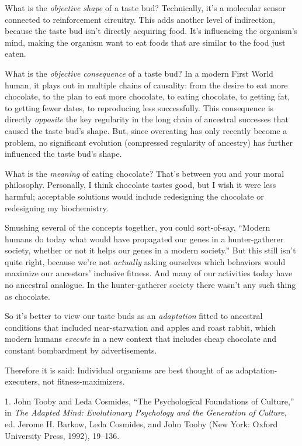 {
 What is the \textit{objective shape} of a taste bud? Technically,
it's a molecular sensor connected to reinforcement
circuitry. This adds another level of indirection, because the taste
bud isn't directly acquiring food. It's
influencing the organism's mind, making the organism
want to eat foods that are similar to the food just eaten.}

{
 What is the \textit{objective consequence} of a taste bud? In a
modern First World human, it plays out in multiple chains of causality:
from the desire to eat more chocolate, to the plan to eat more
chocolate, to eating chocolate, to getting fat, to getting fewer dates,
to reproducing less successfully. This consequence is directly
\textit{opposite} the key regularity in the long chain of ancestral
successes that caused the taste bud's shape. But, since
overeating has only recently become a problem, no significant evolution
(compressed regularity of ancestry) has further influenced the taste
bud's shape.}

{
 What is the \textit{meaning} of eating chocolate?
That's between you and your moral philosophy.
Personally, I think chocolate tastes good, but I wish it were less
harmful; acceptable solutions would include redesigning the chocolate
or redesigning my biochemistry.}

{
 Smushing several of the concepts together, you could sort-of-say,
``Modern humans do today what would have propagated
our genes in a hunter-gatherer society, whether or not it helps our
genes in a modern society.'' But this still
isn't quite right, because we're not
\textit{actually} asking ourselves which behaviors would maximize our
ancestors' inclusive fitness. And many of our
activities today have no ancestral analogue. In the hunter-gatherer
society there wasn't any such thing as chocolate.}

{
 So it's better to view our taste buds as an
\textit{adaptation} fitted to ancestral conditions that included
near-starvation and apples and roast rabbit, which modern humans
\textit{execute} in a new context that includes cheap chocolate and
constant bombardment by advertisements.}

{
 Therefore it is said: Individual organisms are best thought of as
adaptation-executers, not fitness-maximizers.}

\myendsectiontext


\bigskip

{
 1. John Tooby and Leda Cosmides, ``The
Psychological Foundations of Culture,'' in
\textit{The Adapted Mind: Evolutionary Psychology and the Generation of
Culture}, ed. Jerome H. Barkow, Leda Cosmides, and John Tooby (New
York: Oxford University Press, 1992), 19--136.}


